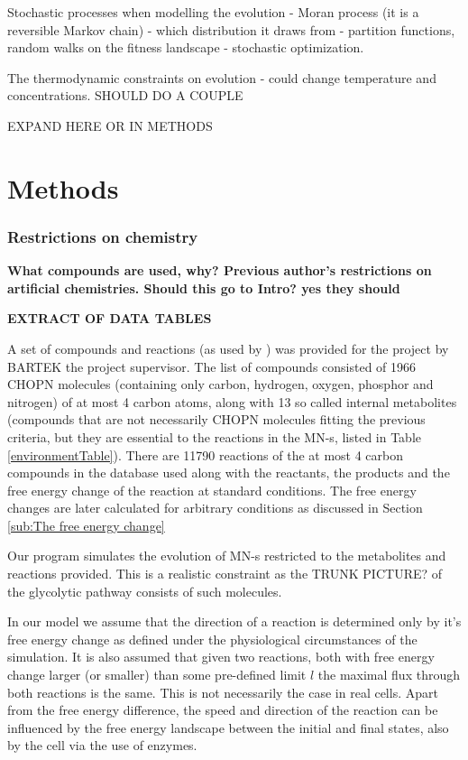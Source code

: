 \documentclass[10pt,a4paper]{article}
\begin{document}
	Stochastic processes when modelling the evolution - Moran process  (it is a reversible Markov chain) - which distribution it draws from - partition functions, random walks on the fitness landscape - stochastic optimization. 


	The thermodynamic constraints on evolution - could change temperature and concentrations.  SHOULD DO A COUPLE
	
	EXPAND HERE OR IN METHODS


	
\section{Methods}
\label{sec:methods}

\subsubsection{Restrictions on chemistry}
\label{ssub:Restrictions on chemistry}
\textbf{
What compounds are used, why?
Previous author's restrictions on artificial chemistries. Should this go to Intro? yes they should }

\textbf{EXTRACT OF DATA TABLES}

	A set of compounds and reactions (as used by \cite[]{BartekLower}) was provided for the project by BARTEK the project supervisor. The list of compounds consisted of 1966 CHOPN molecules (containing only carbon, hydrogen, oxygen, phosphor and nitrogen) of at most 4 carbon atoms, along with 13 so called internal metabolites (compounds that are not necessarily CHOPN molecules fitting the previous criteria, but they are essential to the reactions in the MN-s, listed in Table \ref{environmentTable}). 	There are 11790 reactions of the at most 4 carbon compounds in the database used along with the reactants, the products and the free energy change of the reaction at standard conditions. The free energy changes are later calculated for arbitrary conditions as discussed in Section \ref{sub:The free energy change}

	Our program simulates the evolution of MN-s restricted to the metabolites and reactions provided. This is a realistic constraint as the TRUNK PICTURE? of the glycolytic pathway consists of such molecules.

	In our model we assume that the direction of a reaction is determined only by it's free energy change as defined under the physiological circumstances of the simulation. It is also assumed that given two reactions, both with free energy change larger (or smaller) than some pre-defined limit $l$ the maximal flux through both reactions is the same. This is not necessarily the case in real cells. Apart from the free energy difference, the speed and direction of the reaction can be influenced by the free energy landscape between the initial and final states, also by the cell via the use of enzymes. 
\end{document}
